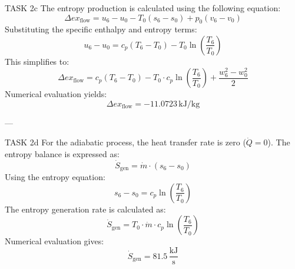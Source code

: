 TASK 2c  
The entropy production is calculated using the following equation:  
\[
\Delta ex_{\text{flow}} = u_6 - u_0 - T_0(s_6 - s_0) + p_0(v_6 - v_0)
\]  
Substituting the specific enthalpy and entropy terms:  
\[
u_6 - u_0 = c_p(T_6 - T_0) - T_0 \ln \left(\frac{T_6}{T_0}\right)
\]  
This simplifies to:  
\[
\Delta ex_{\text{flow}} = c_p(T_6 - T_0) - T_0 \cdot c_p \ln \left(\frac{T_6}{T_0}\right) + \frac{w_6^2 - w_0^2}{2}
\]  
Numerical evaluation yields:  
\[
\Delta ex_{\text{flow}} = -11.0723 \, \text{kJ/kg}
\]  

---

TASK 2d  
For the adiabatic process, the heat transfer rate is zero (\( \dot{Q} = 0 \)).  
The entropy balance is expressed as:  
\[
\dot{S}_{\text{gen}} = \dot{m} \cdot (s_6 - s_0)
\]  
Using the entropy equation:  
\[
s_6 - s_0 = c_p \ln \left(\frac{T_6}{T_0}\right)
\]  
The entropy generation rate is calculated as:  
\[
\dot{S}_{\text{gen}} = T_0 \cdot \dot{m} \cdot c_p \ln \left(\frac{T_6}{T_0}\right)
\]  
Numerical evaluation gives:  
\[
\dot{S}_{\text{gen}} = 81.5 \, \frac{\text{kJ}}{\text{s}}
\]